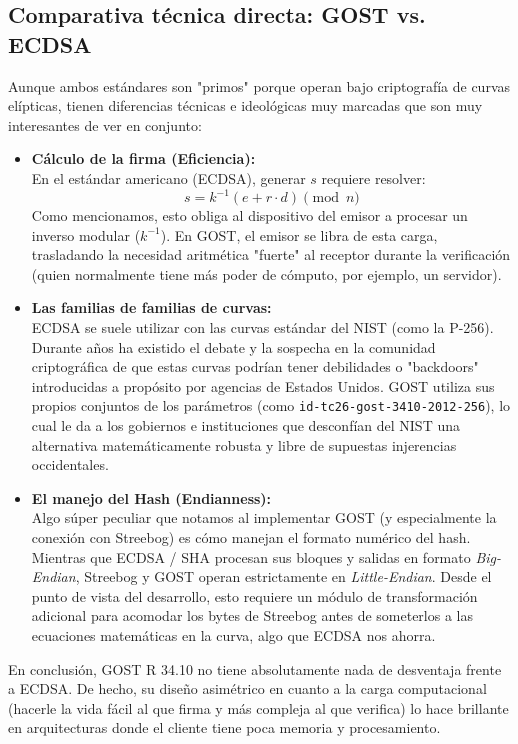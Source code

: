 \subsection{Comparativa técnica directa: GOST vs. ECDSA}

Aunque ambos estándares son "primos" porque operan bajo criptografía de curvas elípticas, tienen diferencias técnicas e ideológicas muy marcadas que son muy interesantes de ver en conjunto:

\begin{itemize}
    \item \textbf{Cálculo de la firma (Eficiencia):} \\
    En el estándar americano (ECDSA), generar $s$ requiere resolver: 
    $$s = k^{-1}(e + r \cdot d) \pmod n$$
    Como mencionamos, esto obliga al dispositivo del emisor a procesar un inverso modular ($k^{-1}$). En GOST, el emisor se libra de esta carga, trasladando la necesidad aritmética "fuerte" al receptor durante la verificación (quien normalmente tiene más poder de cómputo, por ejemplo, un servidor).

    \item \textbf{Las familias de familias de curvas:} \\
    ECDSA se suele utilizar con las curvas estándar del NIST (como la P-256). Durante años ha existido el debate y la sospecha en la comunidad criptográfica de que estas curvas podrían tener debilidades o "backdoors" introducidas a propósito por agencias de Estados Unidos. GOST utiliza sus propios conjuntos de los parámetros (como \texttt{id-tc26-gost-3410-2012-256}), lo cual le da a los gobiernos e instituciones que desconfían del NIST una alternativa matemáticamente robusta y libre de supuestas injerencias occidentales.

    \item \textbf{El manejo del Hash (Endianness):} \\
    Algo súper peculiar que notamos al implementar GOST (y especialmente la conexión con Streebog) es cómo manejan el formato numérico del hash. Mientras que ECDSA / SHA procesan sus bloques y salidas en formato \textit{Big-Endian}, Streebog y GOST operan estrictamente en \textit{Little-Endian}. Desde el punto de vista del desarrollo, esto requiere un módulo de transformación adicional para acomodar los bytes de Streebog antes de someterlos a las ecuaciones matemáticas en la curva, algo que ECDSA nos ahorra.
\end{itemize}

En conclusión, GOST R 34.10 no tiene absolutamente nada de desventaja frente a ECDSA. De hecho, su diseño asimétrico en cuanto a la carga computacional (hacerle la vida fácil al que firma y más compleja al que verifica) lo hace brillante en arquitecturas donde el cliente tiene poca memoria y procesamiento.